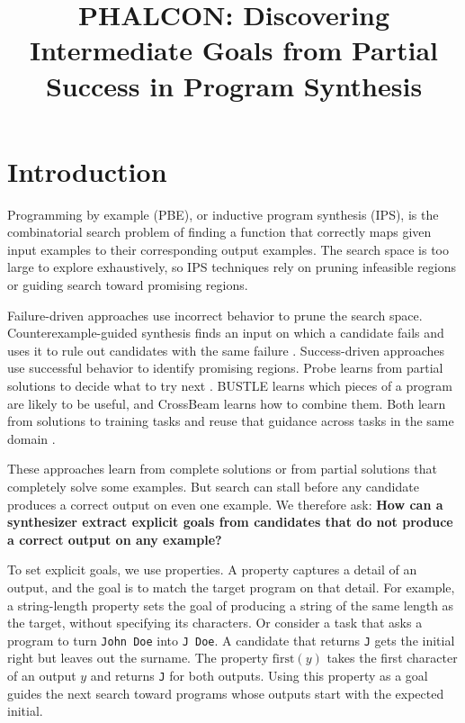 \documentclass[letterpaper]{article} %
\title{PHALCON: Discovering Intermediate Goals from Partial Success in Program Synthesis}
\author{}
\begin{document}
\maketitle

\begin{abstract}
\end{abstract}

\section{Introduction}

Programming by example (PBE), or inductive program synthesis (IPS),
is the combinatorial search problem of finding a function that correctly
maps given input examples to their corresponding output examples.
The search space is too large to explore exhaustively, so IPS techniques
rely on pruning infeasible regions or guiding search toward promising
regions.

Failure-driven approaches use incorrect behavior to prune the search
space. Counterexample-guided synthesis finds an input on which a candidate
fails and uses it to rule out candidates with the same failure
\citep{solarlezama2006sketching}. Success-driven approaches use successful
behavior to identify promising regions. Probe learns from partial
solutions to decide what to try next \citep{barke2020probe}. BUSTLE
learns which pieces of a program are likely to be useful, and CrossBeam
learns how to combine them. Both learn from solutions to training tasks
and reuse that guidance across tasks in the same domain
\citep{odena2021bustle,shi2022crossbeam}.

These approaches learn from complete solutions or from partial solutions
that completely solve some examples.
But search can stall before any candidate produces a correct output on
even one example. We therefore ask:
\textbf{How can a synthesizer extract explicit goals from candidates
that do not produce a correct output on any example?}

To set explicit goals, we use properties. A property
captures a detail of an output, and the goal is to match the target program on
that detail. For example, a string-length property sets the
goal of producing a string of the same length as the target, without
specifying its characters. Or consider a task that asks a program to turn
\texttt{John Doe} into \texttt{J Doe}. A candidate that returns
\texttt{J} gets the initial right but leaves out the surname. The
property \(\mathrm{first}(y)\) takes the first character of an output \(y\) and
returns \texttt{J} for both outputs. Using this property as a goal
guides the next search toward programs whose outputs start with the
expected initial.
\end{document}
